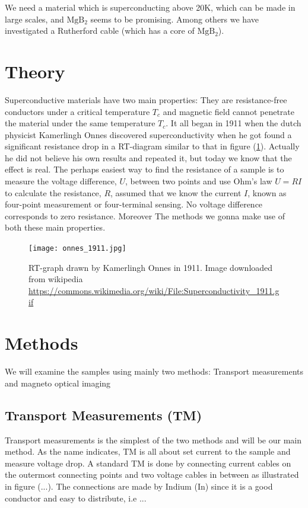 \documentclass{comjnl}
\newcommand*\chem[1]{\ensuremath{\mathrm{#1}}}
\begin{document}
We need a material which is superconducting above 20K, which can be made in large scales, and \chem{MgB_2} seems to be promising. Among others we have investigated a Rutherford cable (which has a core of \chem{MgB_2}).

\section{Theory}\label{Sec:Theory}
Superconductive materials have two main properties: They are resistance-free conductors under a critical temperature $T_c$ and magnetic field cannot penetrate the material under the same temperature $T_c$. It all began in 1911 when the dutch physicist Kamerlingh Onnes discovered superconductivity when he got found a significant resistance drop in a RT-diagram similar to that in figure (\ref{fig:onnes_1911}). Actually he did not believe his own results and repeated it, but today we know that the effect is real. The perhaps easiest way to find the resistance of a sample is to measure the voltage difference, $U$, between two points and use Ohm's law $U=RI$ to calculate the resistance, $R$, assumed that we know the current $I$, known as four-point measurement or four-terminal sensing. No voltage difference corresponds to zero resistance.  Moreover  The methods we gonna make use of both these main properties.

\begin{figure}[h]
\centering
\texttt{[image: onnes\_1911.jpg]}
\caption{RT-graph drawn by Kamerlingh Onnes in 1911. Image downloaded from wikipedia \url{https://commons.wikimedia.org/wiki/File:Superconductivity_1911.gif} \label{fig:onnes_1911}}
\end{figure}

\section{Methods}\label{Sec:Methods}
We will examine the samples using mainly two methods: Transport measurements and magneto optical imaging

\subsection{Transport Measurements (TM)}
Transport measurements is the simplest of the two methods and will be our main method. As the name indicates, TM is all about set current to the sample and measure voltage drop. A standard TM is done by connecting current cables on the outermost connecting points and two voltage cables in between as illustrated in figure (...). The connections are made by Indium (In) since it is a good conductor and easy to distribute, i.e ...
\end{document}
